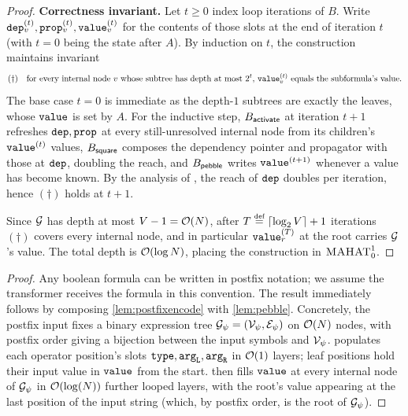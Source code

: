 \documentclass{article}
\begin{document}
\begin{proof}
    \textbf{Correctness invariant.}
    Let $t \ge 0$ index loop iterations of $B$.
    Write ${\mathtt{dep}}^{(t)}_v, {\mathtt{prop}}^{(t)}_v, {\mathtt{value}}^{(t)}_v$ for the contents of those slots at the end of iteration $t$ (with $t = 0$ being the state after $A$).
    By induction on $t$, the construction maintains  invariant
    \begin{equation*}
        (\dagger)\quad\text{for every internal node $v$ whose subtree has depth at most $2^t$, } {\mathtt{value}}^{(t)}_v \text{ equals the subformula's value.}
    \end{equation*}
    The base case $t = 0$ is immediate as the depth-$1$ subtrees are exactly the leaves, whose ${\mathtt{value}}$ is set by $A$.
    For the inductive step, $B_{{\textsf{activate}}}$ at iteration $t+1$ refreshes ${\mathtt{dep}}, {\mathtt{prop}}$ at every still-unresolved internal node from its children's ${\mathtt{value}}^{(t)}$ values, $B_{{\textsf{square}}}$ composes the dependency pointer and propagator with those at ${\mathtt{dep}}$, doubling the reach, and $B_{{\textsf{pebble}}}$ writes ${\mathtt{value}}^{(t+1)}$ whenever a value has become known.
    By the analysis of \citet{rytter-2pda}, the reach of ${\mathtt{dep}}$ doubles per iteration, hence $(\dagger)$ holds at $t+1$.
    
    Since ${ \mathcal{G}}$ has depth at most $V - 1 = {{ \mathcal{O}}}({{ N}})$, after $T \defeq \lceil \log_2 V \rceil + 1$ iterations $(\dagger)$ covers every internal node, and in particular ${\mathtt{value}}^{(T)}_r$ at the root carries ${ \mathcal{G}}$'s value.
    The total depth is ${{ \mathcal{O}}}(\log {{ N}})$, placing the construction in ${{\textsc{MAHAT}}}^1_0$.
\end{proof}

\reach*
\begin{proof}\label{app:proofreach}
    Any boolean formula can be written in postfix notation; we assume the transformer receives the formula in this convention. 
    The result immediately follows by composing \cref{lem:postfixencode} with \cref{lem:pebble}. 
    Concretely, the postfix input fixes a binary expression tree ${ \mathcal{G}}_\psi = ({\mathcal{V}}_\psi, {\mathcal{E}}_\psi)$ on ${{ \mathcal{O}}}({{ N}})$ nodes, with postfix order giving a bijection between the input symbols and ${\mathcal{V}}_\psi$.  populates each operator position's slots ${\mathtt{type}}, {\mathtt{arg}_\mathtt{L}}, {\mathtt{arg}_\mathtt{R}}$ in ${{ \mathcal{O}}}(1)$ layers; leaf positions hold their input value in ${\mathtt{value}}$ from the start.  then fills ${\mathtt{value}}$ at every internal node of ${ \mathcal{G}}_\psi$ in ${{ \mathcal{O}}}(\log({{ N}}))$ further looped layers, with the root's value appearing at the last position of the input string (which, by postfix order, is the root of ${ \mathcal{G}}_\psi$).
\end{proof}
\end{document}
